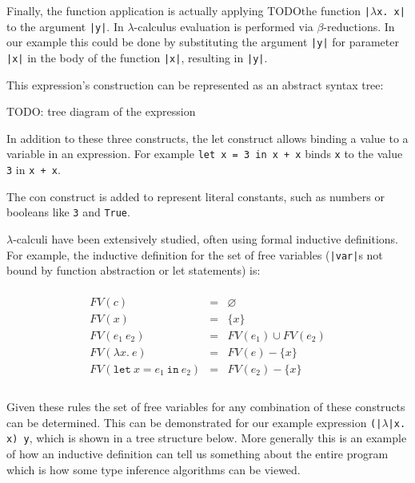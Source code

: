 \documentclass[a4paper,fleqn,oneside,12pt]{report}
\begin{document}
Finally, the function application is actually applying TODOthe function \texttt{|$\lambda$x. x|} to the argument \texttt{|y|}. In $\lambda$-calculus evaluation is performed via $\beta$-reductions. In our example this could be done by substituting the argument \texttt{|y|} for parameter \texttt{|x|} in the body of the function \texttt{|x|}, resulting in \texttt{|y|}.

This expression’s construction can be represented as an abstract syntax tree:

TODO: tree diagram of the expression

In addition to these three constructs, the let construct allows binding a value to a variable in an expression. For example \texttt{let x = 3 in x + x} binds \texttt{x} to the value \texttt{3} in \texttt{x + x}.

The con construct is added to represent literal constants, such as numbers or booleans like \texttt{3} and \texttt{True}.

$\lambda$-calculi have been extensively studied, often using formal inductive definitions. For example, the inductive definition for the set of free variables (\texttt{|var|}s not bound by function abstraction or let statements) is:

$$\begin{array}{lcl}
  \\
    FV(c)                                       & = & \varnothing\\
    FV(x)                                       & = & \{ x \}\\
    FV(e_1\ e_2)                                & = & FV(e_1) \cup FV(e_2)\\
    FV(\lambda x.\ e  )                         & = & FV(e) - \{ x \}\\
    FV(\mathtt{let}\ x = e_1\ \mathtt{in}\ e_2) & = & FV(e_2) - \{ x \}\\
  \\
\end{array}$$

Given these rules the set of free variables for any combination of these constructs can be determined. This can be demonstrated for our example expression \texttt{(|$\lambda$|x. x) y}, which is shown in a tree structure below. More generally this is an example of how an inductive definition can tell us something about the entire program which is how some type inference algorithms can be viewed.
\end{document}
